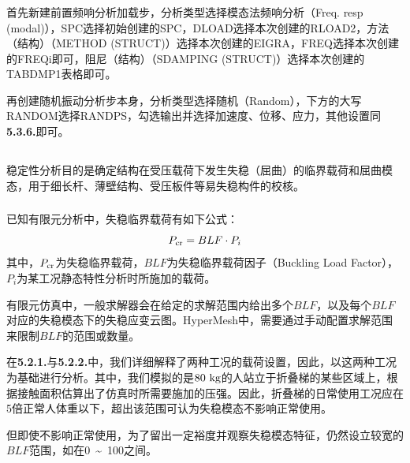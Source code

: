 \documentclass[12pt, oneside, a4paper]{ctexart}
\begin{document}
\subsubsection{}
\par{}
首先新建前置频响分析加载步，分析类型选择模态法频响分析（Freq. resp (modal)），SPC选择初始创建的SPC，DLOAD选择本次创建的RLOAD2，方法（结构）（METHOD (STRUCT)）选择本次创建的EIGRA，FREQ选择本次创建的FREQi即可，阻尼（结构）（SDAMPING (STRUCT)）选择本次创建的TABDMP1表格即可。
\par{}
再创建随机振动分析步本身，分析类型选择随机（Random），下方的大写RANDOM选择RANDPS，勾选输出并选择加速度、位移、应力，其他设置同\textbf{5.3.6.}即可。
\subsection{}
\par{}
稳定性分析目的是确定结构在受压载荷下发生失稳（屈曲）的临界载荷和屈曲模态，用于细长杆、薄壁结构、受压板件等易失稳构件的校核。
\subsubsection{}
\par{}
已知有限元分析中，失稳临界载荷有如下公式：
\begin{equation*}
    P_{\rm cr} = BLF \cdot P_i
\end{equation*}
其中，$P_{\rm cr}$为失稳临界载荷，$BLF$为失稳临界载荷因子（Buckling Load Factor），$P_i$为某工况静态特性分析时所施加的载荷。
\par{}
有限元仿真中，一般求解器会在给定的求解范围内给出多个$BLF$，以及每个$BLF$对应的失稳模态下的失稳应变云图。HyperMesh中，需要通过手动配置求解范围来限制$BLF$的范围或数量。
\par{}
在\textbf{5.2.1.}与\textbf{5.2.2.}中，我们详细解释了两种工况的载荷设置，因此，以这两种工况为基础进行分析。其中，我们模拟的是$\rm 80~kg$的人站立于折叠梯的某些区域上，根据接触面积估算出了仿真时所需要施加的压强。因此，折叠梯的日常使用工况应在5倍正常人体重以下，超出该范围可认为失稳模态不影响正常使用。
\par{}
但即使不影响正常使用，为了留出一定裕度并观察失稳模态特征，仍然设立较宽的$BLF$范围，如在0~\textasciitilde~100之间。
\end{document}

